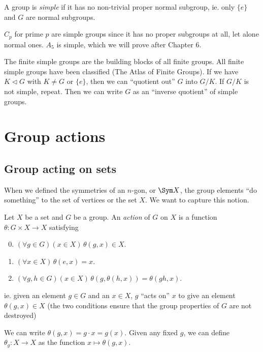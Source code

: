 \documentclass[a4paper]{article}
\begin{document}
\begin{defi}
  A group is \emph{simple} if it has no non-trivial proper normal subgroup, ie. only $\{e\}$ and $G$ are normal subgroups.
\end{defi}

\begin{eg}
  $C_p$ for prime $p$ are simple groups since it has no proper subgroups at all, let alone normal ones.
  $A_5$ is simple, which we will prove after Chapter 6.
\end{eg}

The finite simple groups are the building blocks of all finite groups. All finite simple groups have been classified (The Atlas of Finite Groups). If we have $K\lhd G$ with $K\not= G$ or $\{e\}$, then we can ``quotient out'' $G$ into $G/K$. If $G/K$ is not simple, repeat. Then we can write $G$ as an ``inverse quotient'' of simple groups.

\section{Group actions}
\subsection{Group acting on sets}
When we defined the symmetries of an $n$-gon, or $\Sym X$, the group elements ``do something'' to the set of vertices or the set $X$. We want to capture this notion.

\begin{defi}
  Let $X$ be a set and $G$ be a group. An \emph{action} of $G$ on $X$ is a function $\theta: G\times X\to X$ satisfying
  \begin{enumerate}[label=\arabic{*}.]
      \setcounter{enumi}{-1}
    \item $(\forall g\in G)(x\in X)\,\theta(g, x)\in X$.
    \item $(\forall x\in X)\,\theta(e, x) = x$.
    \item $(\forall g, h\in G)(x\in X)\,\theta(g, \theta (h, x)) = \theta(gh, x)$.
  \end{enumerate}
  ie. given an element $g\in G$ and an $x\in X$, $g$ ``acts on'' $x$ to give an element $\theta(g, x)\in X$ (the two conditions ensure that the group properties of $G$ are not destroyed)
\end{defi}

\begin{notation}
  We can write $\theta(g, x) = g\cdot x = g(x)$. Given any fixed $g$, we can define $\theta_g: X\to X$ as the function $x\mapsto \theta(g, x)$.
\end{notation}
\end{document}
